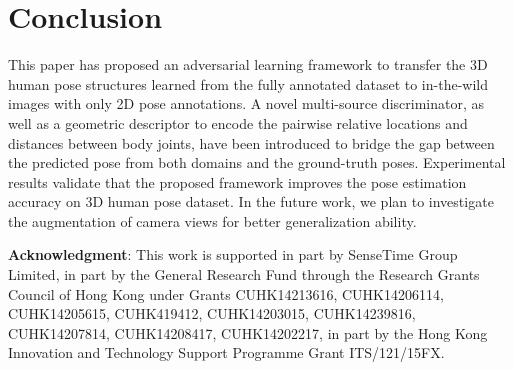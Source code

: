 \documentclass[10pt,twocolumn,letterpaper]{article}
\newcommand{\smalltitle}[1]{\vspace{0.2em}\noindent \textbf{{#1}}}
\begin{document}
\section{Conclusion}
This paper has proposed an adversarial learning framework to transfer the 3D human pose structures learned from the fully annotated dataset to in-the-wild images with only 2D pose annotations.  
A novel multi-source discriminator, as well as a geometric descriptor to encode the pairwise relative locations and distances between body joints, have been introduced to bridge the gap between the predicted pose from both domains and the ground-truth poses. Experimental results validate that the proposed framework improves the pose estimation accuracy on 3D human pose dataset. 
In the future work, we plan to investigate the augmentation of camera views for better generalization ability. 

\smalltitle{Acknowledgment}: 
This work is supported in part by SenseTime Group Limited, in part by the General Research Fund through the Research Grants Council of Hong Kong under Grants CUHK14213616, CUHK14206114, CUHK14205615, CUHK419412, CUHK14203015, CUHK14239816, CUHK14207814, CUHK14208417, CUHK14202217,  in part by the Hong Kong Innovation and Technology Support Programme Grant ITS/121/15FX.


{\small


}
\end{document}

